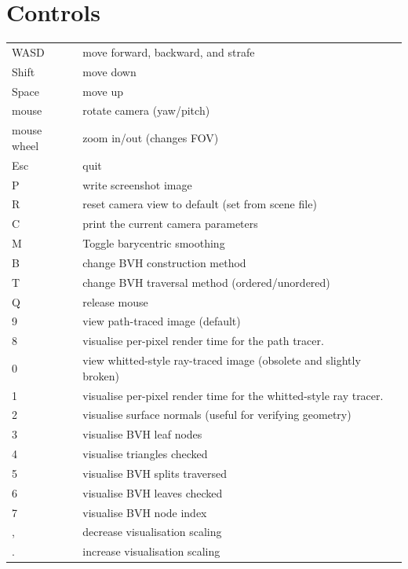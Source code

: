 \section{Controls}
    \begin{tabular}{ll}
    \hline
    WASD & move forward, backward, and strafe \\
    Shift & move down \\
    Space & move up \\
    mouse & rotate camera (yaw/pitch) \\
    mouse wheel & zoom in/out (changes FOV) \\
    \hline
    Esc & quit \\
    P   & write screenshot image \\
    R   & reset camera view to default (set from scene file) \\
    C   & print the current camera parameters \\
    M   & Toggle barycentric smoothing \\
    B   & change BVH construction method \\
    T   & change BVH traversal method (ordered/unordered) \\
    Q   & release mouse \\
    \hline
    9   & view path-traced image (default) \\
    8   & visualise per-pixel render time for the path tracer. \\
    0   & view whitted-style ray-traced image (obsolete and slightly broken) \\
    1   & visualise per-pixel render time for the whitted-style ray tracer. \\
    2   & visualise surface normals (useful for verifying geometry) \\
    3   & visualise BVH leaf nodes \\
    4   & visualise triangles checked \\
    5   & visualise BVH splits traversed \\
    6   & visualise BVH leaves checked  \\
    7   & visualise BVH node index \\
    ,   & decrease visualisation scaling \\
    .   & increase visualisation scaling \\
    \hline
    \end{tabular}

